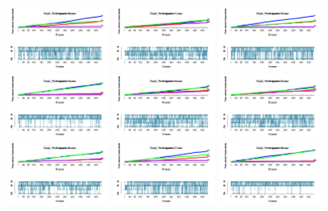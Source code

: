 \begin{figure}[th]
\includegraphics[width=0.30\textwidth]{Figures/Outcome_Exp2_P10} \includegraphics[width=0.30\textwidth]{Figures/Outcome_Exp2_P11} \includegraphics[width=0.30\textwidth]{Figures/Outcome_Exp2_P12}
\includegraphics[width=0.30\textwidth]{Figures/Outcome_Exp2_P13} \includegraphics[width=0.30\textwidth]{Figures/Outcome_Exp2_P14} \includegraphics[width=0.30\textwidth]{Figures/Outcome_Exp2_P15}
\includegraphics[width=0.30\textwidth]{Figures/Outcome_Exp2_P16} \includegraphics[width=0.30\textwidth]{Figures/Outcome_Exp2_P17} \includegraphics[width=0.30\textwidth]{Figures/Outcome_Exp2_P18}

\end{figure}
